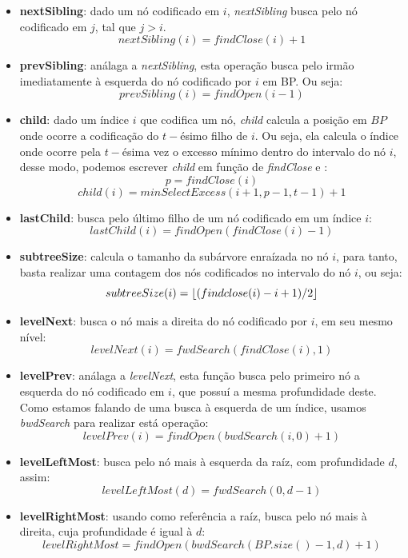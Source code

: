\begin{itemize}
        \item \textbf{nextSibling}: dado um nó codificado em $i$, \textit{nextSibling} busca pelo nó codificado em $j$, tal que $j>i$.
        $$nextSibling(i) = findClose(i) +1$$
        
        \item \textbf{prevSibling}: análaga a \textit{nextSibling}, esta operação busca pelo irmão imediatamente à esquerda do nó codificado por $i$ em BP. Ou seja:
        $$prevSibling(i) = findOpen(i-1)$$
        
        \item \textbf{child}: dado um índice $i$ que codifica um nó, \textit{child} calcula a posição em $BP$ onde ocorre a codificação do $t-$ésimo filho de $i$. 
        Ou seja, ela calcula o índice onde ocorre pela $t-$ésima vez o excesso mínimo dentro do intervalo do nó $i$, desse modo, podemos escrever
        \textit{child} em função de \textit{findClose} e :
        $$p = findClose(i)$$
        $$child(i) = minSelectExcess(i+1,p-1,t-1) + 1 $$

        \item \textbf{lastChild}: busca pelo último filho de um nó codificado em um índice $i$:
        $$lastChild(i) = findOpen(findClose(i)-1)$$
        
        \item  \textbf{subtreeSize}: calcula o tamanho da subárvore enraízada no nó $i$, para tanto, basta realizar uma contagem dos nós codificados no intervalo do 
        nó $i$, ou seja:
        $$subtreeSize(i)= \lfloor(findclose(i) - i + 1)/2\rfloor$$
        
        \item \textbf{levelNext}: busca o nó mais a direita do nó codificado por $i$, em seu mesmo nível:
        $$levelNext(i) = fwdSearch(findClose(i),1)$$
        
        \item \textbf{levelPrev}: análaga a \textit{levelNext}, esta função busca pelo primeiro nó a esquerda do nó codificado em $i$, que possuí a mesma profundidade deste. 
        Como estamos falando de uma busca à esquerda de um índice, usamos \textit{bwdSearch} para realizar está operação:
        $$levelPrev(i) = findOpen(bwdSearch(i,0)+1)$$
        
        \item \textbf{levelLeftMost}: busca pelo nó mais à esquerda da raíz, com profundidade $d$, assim:
        $$levelLeftMost(d) = fwdSearch(0,d-1)$$
        
        \item \textbf{levelRightMost}: usando como referência a raíz, busca pelo nó mais à direita, cuja profundidade é igual  à $d$:
        $$levelRightMost = findOpen(bwdSearch(BP.size()-1,d)+1)$$
    \end{itemize}
    
